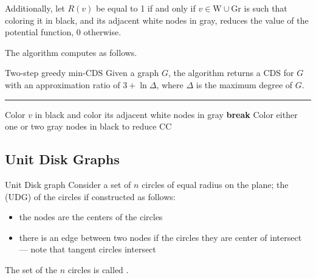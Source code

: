 \documentclass[a4paper, 12pt]{report}
\begin{document}
    Additionally, let $R(v)$ be equal to 1 if and only if $v \in \mathrm W \cup \mathrm{Gr}$ is such that coloring it in black, and its adjacent white nodes in gray, reduces the value of the potential function, 0 otherwise.

    The algorithm computes as follows.

    \begin{framedalgo}{Two-step greedy min-CDS}
        Given a graph $G$, the algorithm returns a CDS for $G$ with an approximation ratio of $3 + \ln \Delta$, where $\Delta$ is the maximum degree of $G$. \\
        \hrule

        \quad
        \label{alg:greedy_min-CDS}
        \begin{algorithmic}[1]
                        \State Color $v$ in black and color its adjacent white nodes in gray
                    \Else
                        \State \textbf{break}
                    \EndIf
                \EndWhile
                \Do
                    \State Color either one or two gray nodes in black to reduce CC
            \EndFunction
        \end{algorithmic}
    \end{framedalgo}


    \subsection{Unit Disk Graphs}

    \begin{frameddefn}{Unit Disk graph}
        Consider a set of $n$ circles of equal radius on the plane; the  (UDG) of the circles if constructed as follows:

        \begin{itemize}
            \item the nodes are the centers of the circles
            \item there is an edge between two nodes if the circles they are center of intersect --- note that tangent circles intersect
        \end{itemize}

        The set of the $n$ circles is called .
    \end{frameddefn}
\end{document}
